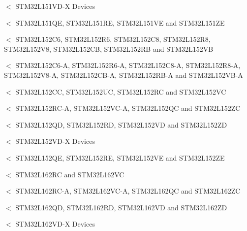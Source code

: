 $<$ S\-T\-M32\-L151\-V\-D-\/\-X Devices

$<$ S\-T\-M32\-L151\-Q\-E, S\-T\-M32\-L151\-R\-E, S\-T\-M32\-L151\-V\-E and S\-T\-M32\-L151\-Z\-E

$<$ S\-T\-M32\-L152\-C6, S\-T\-M32\-L152\-R6, S\-T\-M32\-L152\-C8, S\-T\-M32\-L152\-R8, S\-T\-M32\-L152\-V8, S\-T\-M32\-L152\-C\-B, S\-T\-M32\-L152\-R\-B and S\-T\-M32\-L152\-V\-B

$<$ S\-T\-M32\-L152\-C6-\/\-A, S\-T\-M32\-L152\-R6-\/\-A, S\-T\-M32\-L152\-C8-\/\-A, S\-T\-M32\-L152\-R8-\/\-A, S\-T\-M32\-L152\-V8-\/\-A, S\-T\-M32\-L152\-C\-B-\/\-A, S\-T\-M32\-L152\-R\-B-\/\-A and S\-T\-M32\-L152\-V\-B-\/\-A

$<$ S\-T\-M32\-L152\-C\-C, S\-T\-M32\-L152\-U\-C, S\-T\-M32\-L152\-R\-C and S\-T\-M32\-L152\-V\-C

$<$ S\-T\-M32\-L152\-R\-C-\/\-A, S\-T\-M32\-L152\-V\-C-\/\-A, S\-T\-M32\-L152\-Q\-C and S\-T\-M32\-L152\-Z\-C

$<$ S\-T\-M32\-L152\-Q\-D, S\-T\-M32\-L152\-R\-D, S\-T\-M32\-L152\-V\-D and S\-T\-M32\-L152\-Z\-D

$<$ S\-T\-M32\-L152\-V\-D-\/\-X Devices

$<$ S\-T\-M32\-L152\-Q\-E, S\-T\-M32\-L152\-R\-E, S\-T\-M32\-L152\-V\-E and S\-T\-M32\-L152\-Z\-E

$<$ S\-T\-M32\-L162\-R\-C and S\-T\-M32\-L162\-V\-C

$<$ S\-T\-M32\-L162\-R\-C-\/\-A, S\-T\-M32\-L162\-V\-C-\/\-A, S\-T\-M32\-L162\-Q\-C and S\-T\-M32\-L162\-Z\-C

$<$ S\-T\-M32\-L162\-Q\-D, S\-T\-M32\-L162\-R\-D, S\-T\-M32\-L162\-V\-D and S\-T\-M32\-L162\-Z\-D

$<$ S\-T\-M32\-L162\-V\-D-\/\-X Devices

